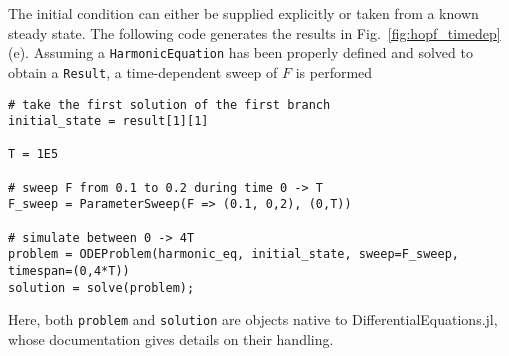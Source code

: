 The initial condition can either be supplied explicitly or taken from a known steady state. The following code generates the results in Fig.~\ref{fig:hopf_timedep}(e). Assuming a \texttt{HarmonicEquation} has been properly defined and solved to obtain a \texttt{Result}, a time-dependent sweep of $F$ is performed

\begin{lstlisting}[numbers=none]
# take the first solution of the first branch
initial_state = result[1][1]

T = 1E5

# sweep F from 0.1 to 0.2 during time 0 -> T
F_sweep = ParameterSweep(F => (0.1, 0,2), (0,T))

# simulate between 0 -> 4T
problem = ODEProblem(harmonic_eq, initial_state, sweep=F_sweep, timespan=(0,4*T))
solution = solve(problem);
\end{lstlisting}
Here, both \texttt{problem} and \texttt{solution} are objects native to DifferentialEquations.jl, whose documentation gives details on their handling.
